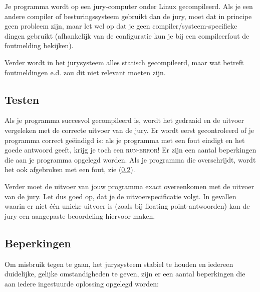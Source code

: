 Je programma wordt op een jury-computer onder Linux gecompileerd.
Als je een andere compiler of besturingssysteem gebruikt dan de jury,
moet dat in principe geen probleem zijn, maar let wel op dat
je geen compiler/systeem-specifieke dingen gebruikt (afhankelijk van
de configuratie kun je bij een compileerfout de foutmelding bekijken).

Verder wordt in het jurysysteem alles statisch gecompileerd, maar
wat betreft foutmeldingen e.d. zou dit niet relevant moeten zijn.

\subsection{Testen}

Als je programma succesvol gecompileerd is, wordt het gedraaid en de
uitvoer vergeleken met de correcte uitvoer van de jury. Er wordt eerst
gecontroleerd of je programma correct ge\"eindigd is: als je programma
met een fout eindigt en het goede antwoord geeft, krijg je toch een
\textsc{run-error}! Er zijn een aantal beperkingen die aan je programma
opgelegd worden. Als je programma die overschrijdt, wordt het ook
afgebroken met een fout, zie (\ref{runlimits}).

Verder moet de uitvoer van jouw programma exact overeenkomen met de
uitvoer van de jury. Let dus goed op, dat je de uitvoerspecificatie
volgt. In gevallen waarin er niet \'e\'en unieke uitvoer is (zoals bij
floating point-antwoorden) kan de jury een aangepaste beoordeling
hiervoor maken.

\subsection{Beperkingen}\label{runlimits}

Om misbruik tegen te gaan, het jurysysteem stabiel te houden en iedereen
duidelijke, gelijke omstandigheden te geven, zijn er een aantal
beperkingen die aan iedere ingestuurde oplossing opgelegd worden:

